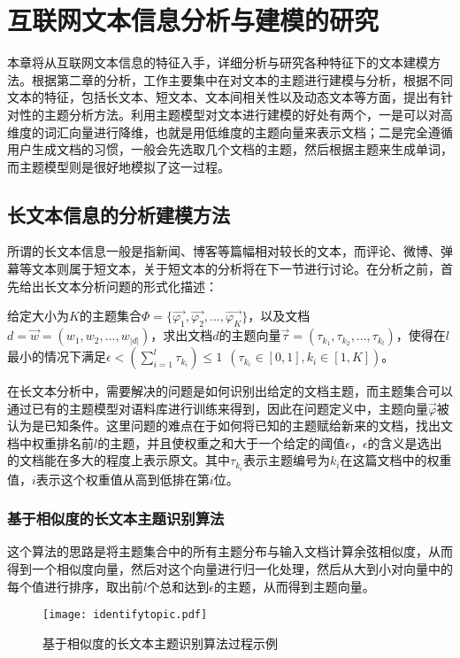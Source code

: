 \section{互联网文本信息分析与建模的研究}
本章将从互联网文本信息的特征入手，详细分析与研究各种特征下的文本建模方法。根据第二章的分析，工作主要集中在对文本的主题进行建模与分析，根据不同文本的特征，包括长文本、短文本、文本间相关性以及动态文本等方面，提出有针对性的主题分析方法。利用主题模型对文本进行建模的好处有两个，一是可以对高维度的词汇向量进行降维，也就是用低维度的主题向量来表示文档；二是完全遵循用户生成文档的习惯，一般会先选取几个文档的主题，然后根据主题来生成单词，而主题模型则是很好地模拟了这一过程。

\subsection{长文本信息的分析建模方法}
所谓的长文本信息一般是指新闻、博客等篇幅相对较长的文本，而评论、微博、弹幕等文本则属于短文本，关于短文本的分析将在下一节进行讨论。在分析之前，首先给出长文本分析问题的形式化描述：

\begin{mydef}[长文本主题识别问题]
  给定大小为$K$的主题集合$\Phi=\{\vec{\varphi_1},\vec{\varphi_2},...,\vec{\varphi_K}\}$，以及文档$d=\vec{w}=(w_1,w_2,...,w_{|d|})$，求出文档$d$的主题向量$\vec{\tau}=(\tau_{k_1},\tau_{k_2},...,\tau_{k_l})$，使得在$l$最小的情况下满足$\epsilon<(\sum_{i=1}^{l}\tau_{k_i})\le 1~~(\tau_{k_i}\in [0,1],k_i\in [1,K])$。
\end{mydef}

在长文本分析中，需要解决的问题是如何识别出给定的文档主题，而主题集合可以通过已有的主题模型对语料库进行训练来得到，因此在问题定义中，主题向量$\vec{\varphi}$被认为是已知条件。这里问题的难点在于如何将已知的主题赋给新来的文档，找出文档中权重排名前$l$的主题，并且使权重之和大于一个给定的阈值$\epsilon$，$\epsilon$的含义是选出的文档能在多大的程度上表示原文。其中$\tau_{k_i}$表示主题编号为$k_i$在这篇文档中的权重值，$i$表示这个权重值从高到低排在第$i$位。

\subsubsection{基于相似度的长文本主题识别算法}
这个算法的思路是将主题集合中的所有主题分布与输入文档计算余弦相似度，从而得到一个相似度向量，然后对这个向量进行归一化处理，然后从大到小对向量中的每个值进行排序，取出前$l$个总和达到$\epsilon$的主题，从而得到主题向量。

\begin{figure}[ht]
\centering
\texttt{[image: identifytopic.pdf]}
\caption{基于相似度的长文本主题识别算法过程示例}
\label{fig:identifytopic}
\end{figure}

